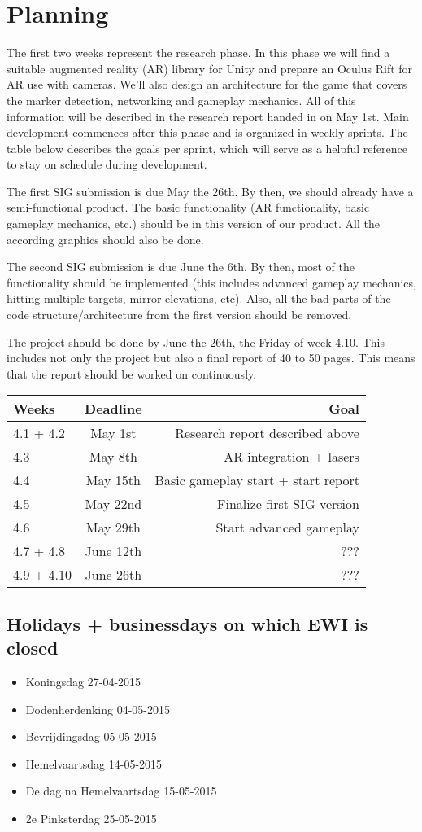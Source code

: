 \section{Planning}

The first two weeks represent the research phase. In this phase we will find a suitable augmented reality (AR) library for Unity and prepare an Oculus Rift for AR use with cameras. We'll also design an architecture for the game that covers the marker detection, networking and gameplay mechanics. All of this information will be described in the research report handed in on May 1st. Main development commences after this phase and is organized in weekly sprints. The table below describes the goals per sprint, which will serve as a helpful reference to stay on schedule during development.

The first SIG submission is due May the 26th. By then, we should already have a semi-functional product. The basic functionality (AR functionality, basic gameplay mechanics, etc.) should be in this version of our product. All the according graphics should also be done.

The second SIG submission is due June the 6th. By then, most of the functionality should be implemented (this includes advanced gameplay mechanics, hitting multiple targets, mirror elevations, etc). Also, all the bad parts of the code structure/architecture from the first version should be removed.

The project should be done by June the 26th, the Friday of week 4.10. This includes not only the project but also a final report of 40 to 50 pages. This means that the report should be worked on continuously.
 
\begin{tabular}{|l|c|r|}
	\hline
	Weeks & Deadline & Goal \\ \hline
	4.1 + 4.2 & May 1st & Research report described above \\ \hline
	4.3 & May 8th & AR integration + lasers \\ \hline
	4.4 & May 15th & Basic gameplay start + start report \\ \hline
	4.5 & May 22nd & Finalize first SIG version \\ \hline
	4.6 & May 29th & Start advanced gameplay \\ \hline
	4.7 + 4.8 & June 12th & ??? \\ \hline
	4.9 + 4.10 & June 26th & ??? \\ \hline
\end{tabular}

\subsection{Holidays + businessdays on which EWI is closed}

\begin{itemize}
	\item Koningsdag 27-04-2015
	\item Dodenherdenking 04-05-2015
	\item Bevrijdingsdag 05-05-2015
	\item Hemelvaartsdag 14-05-2015
	\item De dag na Hemelvaartsdag 15-05-2015
	\item 2e Pinksterdag 25-05-2015
\end{itemize}